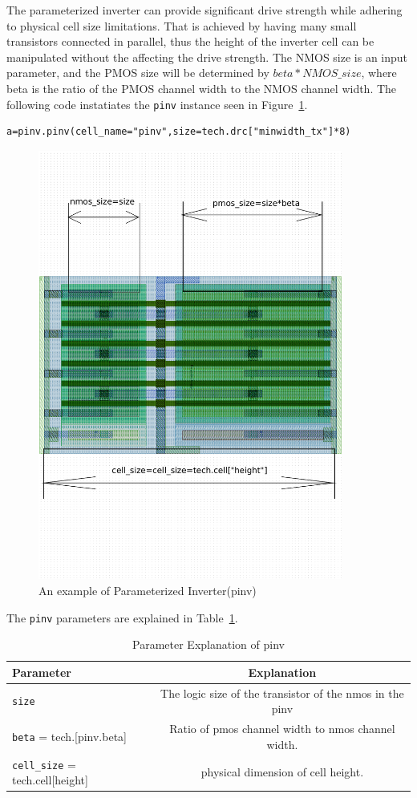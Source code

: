 The parameterized inverter can provide significant drive strength
while adhering to physical cell size limitations. That is achieved by
having many small transistors connected in parallel, thus the height
of the inverter cell can be manipulated without the affecting the
drive strength. The NMOS size is an input parameter, and the PMOS size
will be determined by $beta*NMOS\_size$, where beta is the ratio of
the PMOS channel width to the NMOS channel width.  The following code
instatiates the \verb|pinv| instance seen in Figure~\ref{fig:pinv}.
\begin{verbatim}
a=pinv.pinv(cell_name="pinv",size=tech.drc["minwidth_tx"]*8)
\end{verbatim}
\begin{figure}[h!]
\centering
\includegraphics[width=10cm]{./figs/pinv.pdf}
\caption{An example of Parameterized Inverter(pinv)}
\label{fig:pinv}
\end{figure}


The \verb|pinv| parameters are explained in Table~\ref{table:pinv_params}.
\begin{table}[h!] 
  \begin{center}
    \begin{tabular}{| l | c |}
    \hline
    Parameter & Explanation \\ \hline
    \verb|size| & The logic size of the transistor of the nmos in the pinv \\ \hline
    \verb|beta| = tech.[pinv.beta] & Ratio of pmos channel width to nmos channel width. \\ \hline
    \verb|cell_size| = tech.cell[height] & physical dimension of cell height. \\ 
    \hline
    \end{tabular}
  \end{center}
  \caption{Parameter Explanation of pinv}
  \label{table:pinv_params}
\end{table}



